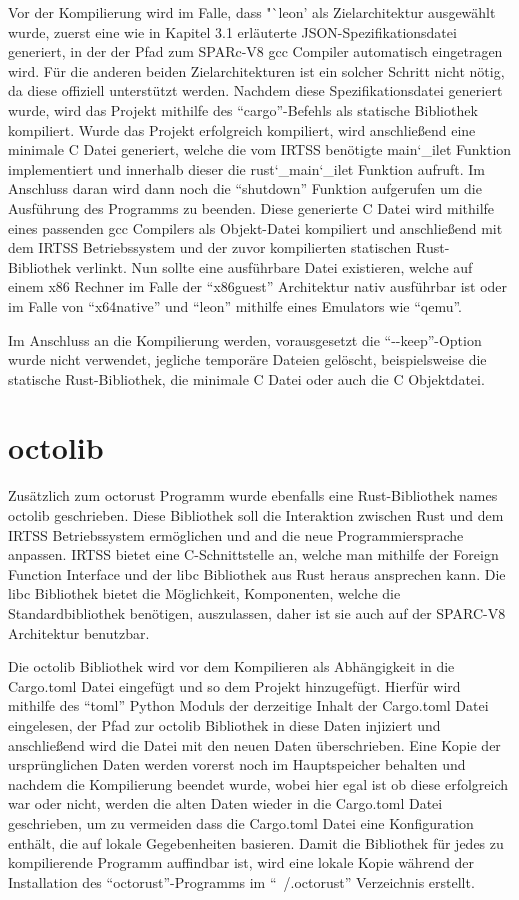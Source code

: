 Vor der Kompilierung wird im Falle, dass "`leon' als Zielarchitektur ausgewählt wurde, zuerst eine wie in Kapitel 3.1 erläuterte
JSON-Spezifikationsdatei generiert, in der der Pfad zum SPARc-V8 gcc Compiler automatisch eingetragen wird. Für die anderen beiden
Zielarchitekturen ist ein solcher Schritt nicht nötig, da diese offiziell unterstützt werden. 
Nachdem diese Spezifikationsdatei generiert wurde, wird das Projekt mithilfe des "`cargo"'-Befehls als statische Bibliothek 
kompiliert. Wurde das Projekt erfolgreich kompiliert, wird anschließend eine minimale C Datei generiert,
welche die vom IRTSS benötigte main\char`_ilet Funktion implementiert und innerhalb
dieser die rust\char`_main\char`_ilet Funktion aufruft. Im Anschluss daran wird dann noch die "`shutdown"' Funktion aufgerufen um die 
Ausführung des Programms zu beenden. Diese generierte C Datei wird mithilfe eines passenden gcc Compilers als Objekt-Datei kompiliert
und anschließend mit dem IRTSS Betriebssystem und der zuvor kompilierten statischen Rust-Bibliothek verlinkt.
Nun sollte eine ausführbare Datei
existieren, welche auf einem x86 Rechner im Falle der "`x86guest"' Architektur nativ ausführbar ist oder im Falle von
"`x64native"' und "`leon"' mithilfe eines Emulators wie "`qemu"'.

Im Anschluss an die Kompilierung werden, vorausgesetzt die "`-{}-keep"'-Option wurde nicht verwendet, jegliche temporäre Dateien
gelöscht, beispielsweise die statische Rust-Bibliothek, die minimale C Datei oder auch die C
Objektdatei.

\section{octolib}

Zusätzlich zum octorust Programm wurde ebenfalls eine Rust-Bibliothek names octolib geschrieben. Diese Bibliothek soll
die Interaktion zwischen Rust und dem IRTSS Betriebssystem ermöglichen und and die neue Programmiersprache anpassen. IRTSS
bietet eine C-Schnittstelle an, welche man mithilfe der Foreign Function Interface und der libc Bibliothek aus Rust heraus ansprechen
kann. Die libc Bibliothek bietet die Möglichkeit, Komponenten, welche die Standardbibliothek benötigen, auszulassen, daher ist sie
auch auf der SPARC-V8 Architektur benutzbar.

Die octolib Bibliothek wird vor dem Kompilieren als Abhängigkeit in die Cargo.toml Datei eingefügt und so dem Projekt hinzugefügt.
Hierfür wird mithilfe des "`toml"' Python Moduls der derzeitige Inhalt der Cargo.toml Datei eingelesen, der
Pfad zur octolib Bibliothek in diese Daten injiziert und anschließend wird die Datei mit den neuen Daten überschrieben.
Eine Kopie der ursprünglichen Daten werden vorerst noch im Hauptspeicher behalten und nachdem die Kompilierung beendet wurde,
wobei hier egal ist ob diese erfolgreich war oder nicht, werden die alten Daten wieder in die Cargo.toml Datei
geschrieben, um zu vermeiden dass die Cargo.toml Datei eine Konfiguration enthält, die auf lokale Gegebenheiten basieren.
Damit die Bibliothek für jedes zu kompilierende Programm auffindbar ist, wird eine lokale Kopie während der Installation des
"`octorust"'-Programms im "`~/.octorust"' Verzeichnis erstellt.

